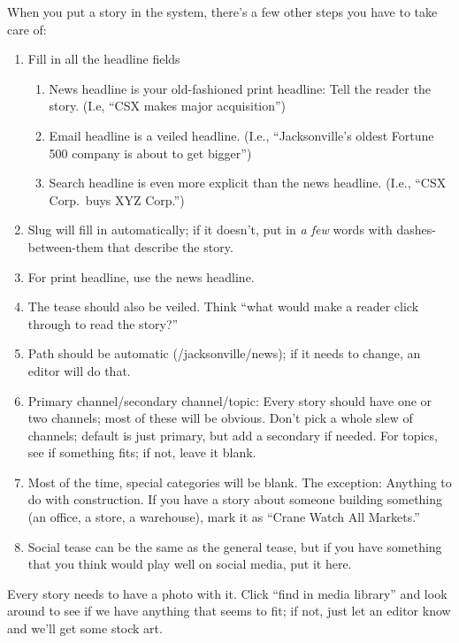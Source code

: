 \documentclass[
  12pt,
  american,
  letterpaperpaper,
  extrafontsizes,onecolumn,openright
  ]{memoir}
\providecommand{\tightlist}{%
  \setlength{\itemsep}{0pt}\setlength{\parskip}{0pt}}
\begin{document}
When you put a story in the system, there's a few other steps you have to take care of:

\begin{enumerate}
\def\labelenumi{\arabic{enumi}.}
\tightlist
\item
  Fill in all the headline fields

  \begin{enumerate}
  \def\labelenumii{\arabic{enumii}.}
  \tightlist
  \item
    News headline is your old-fashioned print headline: Tell the reader the story. (I.e, \enquote{CSX makes major acquisition})
  \item
    Email headline is a veiled headline. (I.e., \enquote{Jacksonville's oldest Fortune 500 company is about to get bigger})
  \item
    Search headline is even more explicit than the news headline. (I.e., \enquote{CSX Corp.~buys XYZ Corp.})
  \end{enumerate}
\item
  Slug will fill in automatically; if it doesn't, put in \emph{a few} words with dashes-between-them that describe the story.
\item
  For print headline, use the news headline.
\item
  The tease should also be veiled. Think \enquote{what would make a reader click through to read the story?}
\item
  Path should be automatic (/jacksonville/news); if it needs to change, an editor will do that.
\item
  Primary channel/secondary channel/topic: Every story should have one or two channels; most of these will be obvious. Don't pick a whole slew of channels; default is just primary, but add a secondary if needed. For topics, see if something fits; if not, leave it blank.
\item
  Most of the time, special categories will be blank. The exception: Anything to do with construction. If you have a story about someone building something (an office, a store, a warehouse), mark it as \enquote{Crane Watch All Markets.}
\item
  Social tease can be the same as the general tease, but if you have something that you think would play well on social media, put it here.
\end{enumerate}

Every story needs to have a photo with it. Click \enquote{find in media library} and look around to see if we have anything that seems to fit; if not, just let an editor know and we'll get some stock art.
\end{document}

